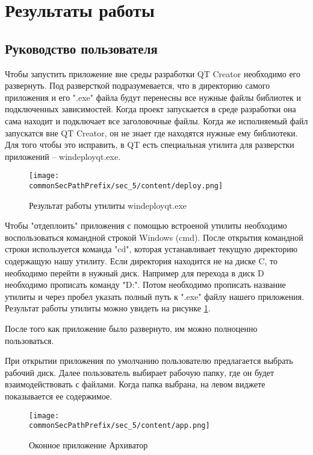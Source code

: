 \section{Результаты работы}
\label{sec:res}


\subsection{Руководство пользователя}


Чтобы запустить приложение вне среды разработки QT Creator необходимо его развернуть.
Под разверсткой подразумевается, что в директорию самого приложения и его ".exe" файла будут перенесны все нужные файлы библиотек и подключенных зависимостей.
Когда проект запускается в среде разработки она сама находит и подключает все заголовочные файлы.
Когда же исполняемый файл запускатся вне QT Creator, он не знает где находятся нужные ему библиотеки.
Для того чтобы это исправить, в QT есть специальная утилита для разверстки приложений -- windeployqt.exe.


\begin{figure}[h]
    \centering
    \texttt{[image: \\commonSecPathPrefix/sec\_5/content/deploy.png]}
    \caption{Результат работы утилиты windeployqt.exe}
    \label{fig:deploy}
\end{figure}


Чтобы "отдеплоить" приложения с помощью встроеной утилиты необходимо воспользоваться командной строкой Windows (cmd).
После открытия командной строки используется команда "cd", которая устанавливает текущую директорию содержащую нашу утилиту.
Если директория находится не на диске C, то необходимо перейти в нужный диск.
Например для перехода в диск D необходимо прописать команду "D:".
Потом необходимо прописать название утилиты и через пробел указать полный путь к ".exe" файлу нашего приложения.
Результат работы утилиты можно увидеть на рисунке \ref{fig:deploy}.



После того как приложение было развернуто, им можно полноценно пользоваться.



При открытии приложения по умолчанию пользователю предлагается выбрать рабочий диск.
Далее пользователь выбирает рабочую папку, где он будет взаимодействовать с файлами.
Когда папка выбрана, на левом виджете показывается ее содержимое.

\begin{figure}[h]
    \centering
    \texttt{[image: \\commonSecPathPrefix/sec\_5/content/app.png]}
    \caption{Оконное приложение Архиватор}
    \label{fig:app}
\end{figure}



